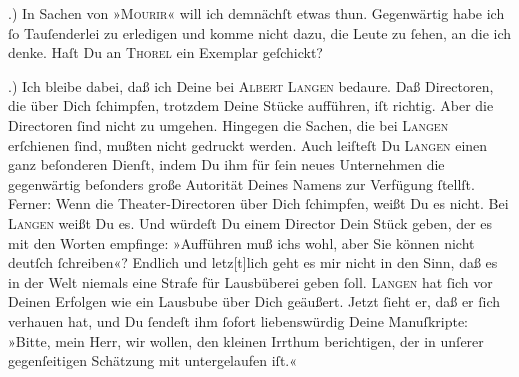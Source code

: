 .) In Sachen von »\textsc{Mourir}« will ich demnächſt etwas thun. Gegenwärtig habe ich ſo Tauſenderlei zu
               erledigen und komme nicht {\pb}dazu, die Leute zu ſehen,
               an die ich denke. Haſt Du an \textsc{Thorel} ein Exemplar
               geſchickt?\pend
           
.) Ich bleibe dabei, daß ich Deine \label{K_L02774-2v}\label{K_L02774-2} bei \textsc{Albert Langen} bedaure.  Daß Directoren, die über Dich
               ſchimpfen, trotzdem Deine Stücke aufführen, iſt richtig. Aber die Directoren ſind
                  \strikeout{\textcolor{gray}{×}\-\textcolor{gray}{×}} nicht zu umgehen. Hingegen die Sachen, die bei \textsc{Langen} erſchienen ſind, mußten nicht  gedruckt
               werden.  Auch leiſteſt Du \textsc{Langen}{ } einen ganz beſonderen Dienſt, indem Du ihm für ſein neues Unternehmen die gegenwärtig {\pb}beſonders große Autorität Deines Namens zur
               Verfügung  ſtellſt. Ferner: Wenn die
               Theater-Directoren über Dich ſchimpfen, weißt Du es nicht. Bei \textsc{Langen} weißt Du es. Und würdeſt Du einem Director Dein Stück geben, der es mit den
               Worten empfinge: »Aufführen muß ichs wohl, aber Sie können nicht deutſch ſchreiben«?
               Endlich und letz{[}t{]}lich geht es mir nicht in den Sinn, daß es in
               der Welt niemals eine Strafe für Lausbüberei geben ſoll. \textsc{Langen} hat ſich vor {\pb}Deinen Erfolgen wie ein Lausbube
               über Dich geäußert. Jetzt ſieht er, daß er ſich verhauen hat, und Du ſendeſt ihm
               ſofort liebenswürdig Deine Manuſkripte: »Bitte, mein Herr, wir wollen, den kleinen Irrthum berichtigen, der in unſerer
               gegenſeitigen Schätzung mit untergelaufen iſt.«\pend
           
